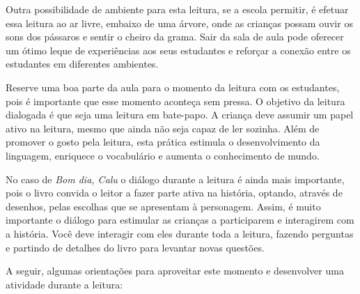 \documentclass[11pt]{extarticle}
\begin{document}
Outra possibilidade de ambiente para esta leitura, se a escola permitir, 
é efetuar essa leitura ao ar livre, embaixo de uma árvore, onde as crianças 
possam ouvir os sons dos pássaros e sentir o cheiro da grama. Sair da sala 
de aula pode oferecer um ótimo leque de experiências aos seus estudantes e 
reforçar a conexão entre os estudantes em diferentes ambientes.  

Reserve uma boa parte da aula para o momento da leitura com os estudantes, 
pois é importante que esse momento aconteça sem pressa. O objetivo da 
leitura dialogada é que seja uma leitura em bate-papo. A criança deve 
assumir um papel ativo na leitura, mesmo que ainda não seja capaz de 
ler sozinha. Além de promover o gosto pela leitura, esta prática estimula 
o desenvolvimento da linguagem, enriquece o vocabulário e 
aumenta o conhecimento de mundo.

No caso de \textit{Bom dia, Calu} o diálogo durante a leitura é 
ainda mais importante, pois o livro convida o leitor a fazer parte ativa na história, optando, através de desenhos, pelas escolhas que se apresentam à personagem. Assim, é muito importante o diálogo para estimular as crianças a participarem e interagirem com a história.
Você deve interagir com eles durante toda a 
leitura, fazendo perguntas e partindo de detalhes do livro para 
levantar novas questões. 

A seguir, algumas orientações para aproveitar este momento e desenvolver uma atividade durante a leitura: 
\end{document}
